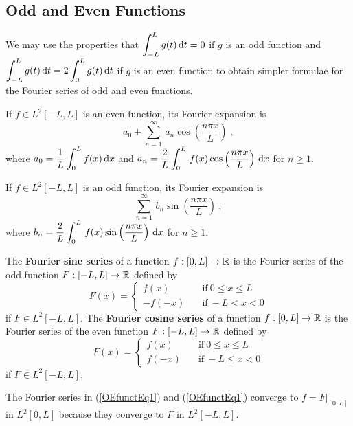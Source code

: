 \subsection{Odd and Even Functions}

We may use the properties that
$\displaystyle \int_{-L}^L g(t) \,\mathrm{d}{t} = 0$ if $g$ is an odd
function and $\displaystyle \int_{-L}^L g(t) \,\mathrm{d}{t} = 2 \int_0^L g(t) \,\mathrm{d}{t}$
if $g$ is an even function to obtain simpler formulae for the Fourier
series of odd and even functions.

If $\displaystyle f \in L^2[-L,L]$ is an even function, its Fourier expansion is
\begin{equation} \label{OEfunctEq1}
a_0 + \sum_{n=1}^{\infty} \,  a_n \cos\left(\frac{n\pi x}{L}\right)  \ ,
\end{equation}
where
$\displaystyle a_0 = \frac{1}{L} \int_{0}^{L} f(x) \,\mathrm{d}{x}$ and
$\displaystyle a_n = \frac{2}{L} \int_{0}^{L} \, f(x)
\cos\left( \frac{n\pi x}{L}\right) \,\mathrm{d}{x}$ for $n \geq 1$.

If $\displaystyle f\in L^2[-L,L]$ is an odd function, its Fourier expansion is
\begin{equation} \label{OEfunctEq2}
\sum_{n=1}^{\infty} \, b_n \sin \left( \frac{n\pi x}{L}\right) \ ,
\end{equation}
where $\displaystyle b_n = \frac{2}{L} \int_{0}^{L} \, f(x)
\sin \left( \frac{n\pi x}{L}\right) \,\mathrm{d}{x}$ for $n \geq 1$.

The {\bfseries Fourier sine series} of a function
$f:[0,L] \rightarrow \mathbb{R}$ is the Fourier series of the odd function
$F:[-L,L]\rightarrow \mathbb{R}$ defined by
\[
F(x) =
\begin{cases}
f(x) & \quad \text{if} \ 0 \leq x \leq L \\
-f(-x) & \quad \text{if} \ -L < x < 0
\end{cases}
\]
if $\displaystyle F \in L^2[-L,L]$.
The {\bfseries Fourier cosine series} of
a function $f:[0,L] \rightarrow \mathbb{R}$ is the Fourier series of the even
function $F:[-L,L]\rightarrow \mathbb{R}$ defined by
\[
F(x) =
\begin{cases}
f(x) & \quad \text{if} \ 0 \leq x \leq L \\
f(-x) & \quad \text{if} \ -L \leq x < 0
\end{cases}
\]
if $\displaystyle F\in L^2[-L,L]$.

The Fourier series in (\ref{OEfunctEq1}) and (\ref{OEfunctEq1})
converge to $\displaystyle f = F\big|_{[0,L]}$ in
$\displaystyle L^2[0,L]$ because they converge to
$F$ in $\displaystyle L^2[-L,L]$.

